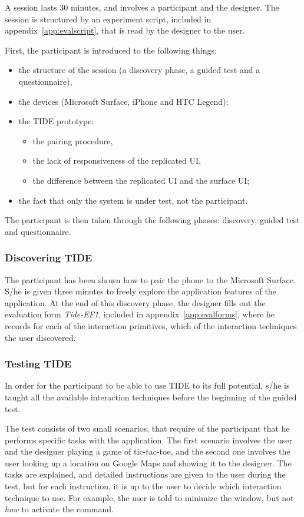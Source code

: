 A session lasts 30 minutes, and involves a participant and the designer.
The session is structured by an experiment script, included in appendix~\ref{app:evalscript}, that is read by the designer to the user.

First, the participant is introduced to the following things:
\begin{itemize}
\item the structure of the session (a discovery phase, a guided test and a questionnaire),
\item the devices (Microsoft Surface, iPhone and HTC Legend);
\item the TIDE prototype:
	\begin{itemize}
	\item the pairing procedure,
	\item the lack of responsiveness of the replicated UI,
	\item the difference between the replicated UI and the surface UI;
	\end{itemize}
\item the fact that only the system is under test, not the participant.
\end{itemize}

The participant is then taken through the following phases: discovery, guided test and questionnaire.

\subsubsection{Discovering TIDE}

The participant has been shown how to pair the phone to the Microsoft Surface.
S/he is given three minutes to freely explore the application features of the application.
At the end of this discovery phase, the designer fills out the evaluation form \emph{Tide-EF1}, included in appendix~\ref{app:evalforms}, where he records for each of the interaction primitives, which of the interaction techniques the user discovered.

\subsubsection{Testing TIDE}

In order for the participant to be able to use TIDE to its full potential, s/he is taught all the available interaction techniques before the beginning of the guided test.

The test consists of two small scenarios, that require of the participant that he performs specific tasks with the application.
The first scenario involves the user and the designer playing a game of tic-tac-toe, and the second one involves the user looking up a location on Google Maps and showing it to the designer.
The tasks are explained, and detailed instructions are given to the user during the test, but for each instruction, it is up to the user to decide which interaction technique to use.
For example, the user is told to minimize the window, but not \emph{how} to activate the command.

